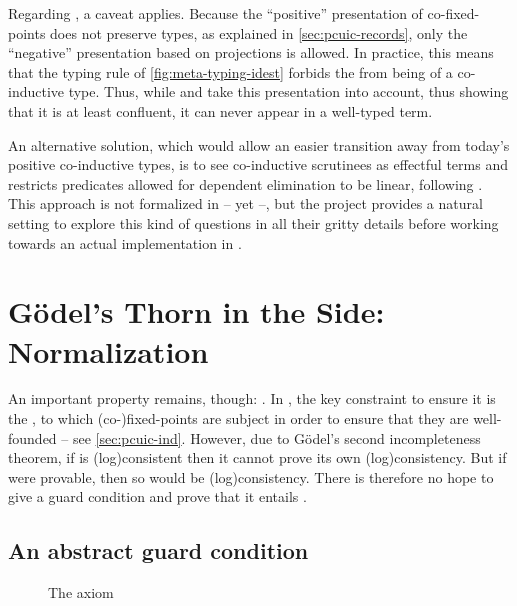 Regarding , a caveat applies. Because the “positive”
presentation of co-fixed-points does not preserve types, as explained in
\cref{sec:pcuic-records}, only the “negative” presentation based on projections is allowed.
In practice, this means
that the typing rule  of \cref{fig:meta-typing-idest}
forbids the  from being of a co-inductive type.%
Thus, while  and  take this presentation into account,%
thus showing that it is at least confluent, it can never appear in a well-typed term.

An alternative solution, which would allow an easier transition away from today’s positive
co-inductive types, is to see co-inductive scrutinees as effectful terms
and restricts predicates allowed
for dependent elimination to be linear, following .
This approach is not formalized in  – yet –, but the project
provides a natural setting to explore this kind of questions in all their gritty details
before working towards an actual implementation in .

\section[Normalization]{Gödel’s Thorn in the Side: Normalization}
\label{sec:meta-normalization}

An important property remains, though: . In , the key constraint to
ensure it is the , to which (co-)fixed-points are subject in order to
ensure that they are well-founded – see \cref{sec:pcuic-ind}.
However, due to Gödel’s second incompleteness theorem, if  is \kl(log){consistent}
then it cannot prove its own \kl(log){consistency}.
But if  were provable, then so would be \kl(log){consistency}.
There is therefore no hope to give a guard condition and prove that it entails .

\subsection{An abstract guard condition}

\begin{figure}[h]
  \caption{The  axiom}
  \label{fig:meta-guard}
\end{figure}

